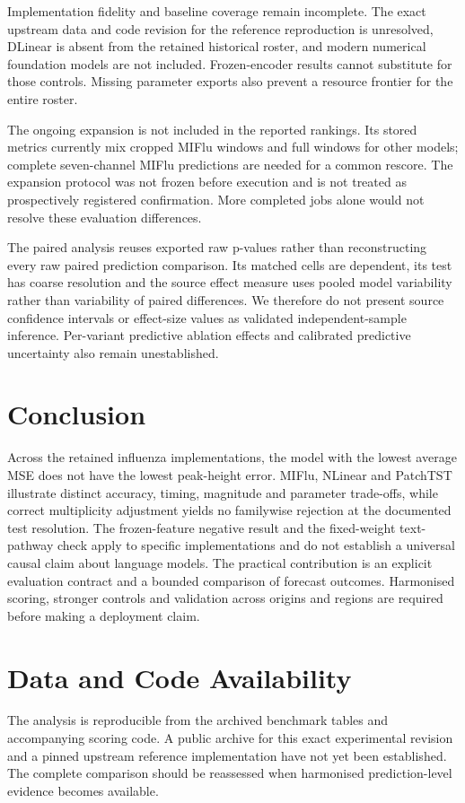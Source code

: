 \documentclass[journal,twoside,print]{ieeecolor}
\begin{document}
Implementation fidelity and baseline coverage remain incomplete. The exact upstream data and code revision for the reference reproduction is unresolved, DLinear is absent from the retained historical roster, and modern numerical foundation models are not included. Frozen-encoder results cannot substitute for those controls. Missing parameter exports also prevent a resource frontier for the entire roster.

The ongoing expansion is not included in the reported rankings. Its stored metrics currently mix cropped MIFlu windows and full windows for other models; complete seven-channel MIFlu predictions are needed for a common rescore. The expansion protocol was not frozen before execution and is not treated as prospectively registered confirmation. More completed jobs alone would not resolve these evaluation differences.

The paired analysis reuses exported raw p-values rather than reconstructing every raw paired prediction comparison. Its matched cells are dependent, its test has coarse resolution and the source effect measure uses pooled model variability rather than variability of paired differences. We therefore do not present source confidence intervals or effect-size values as validated independent-sample inference. Per-variant predictive ablation effects and calibrated predictive uncertainty also remain unestablished.

\section{Conclusion}
Across the retained influenza implementations, the model with the lowest average MSE does not have the lowest peak-height error. MIFlu, NLinear and PatchTST illustrate distinct accuracy, timing, magnitude and parameter trade-offs, while correct multiplicity adjustment yields no familywise rejection at the documented test resolution. The frozen-feature negative result and the fixed-weight text-pathway check apply to specific implementations and do not establish a universal causal claim about language models. The practical contribution is an explicit evaluation contract and a bounded comparison of forecast outcomes. Harmonised scoring, stronger controls and validation across origins and regions are required before making a deployment claim.

\section{Data and Code Availability}
The analysis is reproducible from the archived benchmark tables and accompanying scoring code. A public archive for this exact experimental revision and a pinned upstream reference implementation have not yet been established. The complete comparison should be reassessed when harmonised prediction-level evidence becomes available.
\end{document}
